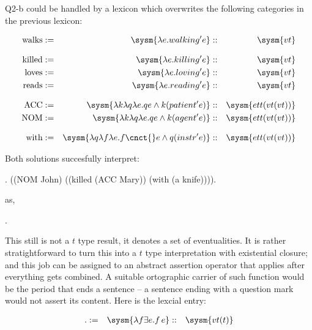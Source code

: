 \documentclass[10pt,a4paper]{exam}
\begin{document}
Q2-b could be handled by a lexicon which overwrites the following categories in the previous lexicon:


\begin{ulexicon}

\begin{align*}
	\text{walks}   &:=& \sysm{\lambda e.walking'e}  &::& \sysm{vt}\\[8pt]
	\text{killed}  &:=& \sysm{\lambda e.killing' e}   &::& \sysm{vt}\\
	\text{loves}   &:=& \sysm{\lambda e.loving' e}   &::& \sysm{vt}\\
	\text{reads}   &:=& \sysm{\lambda e.reading' e}   &::& \sysm{vt}\\[8pt]
	\text{ACC}     &:=& \sysm{\lambda k\lambda q\lambda e.q e \land k (patient' e)} &::& \sysm{ett(vt(vt))}\\
	\text{NOM}     &:=& \sysm{\lambda k\lambda q\lambda e.q e \land k (agent' e)} &::& \sysm{ett(vt(vt))}\\[8pt]
	\text{with}    &:=& \sysm{\lambda q\lambda f \lambda e.f\cnct{} e \land q (instr' e)} &::& \sysm{ett(vt(vt))}\\
\end{align*}

\end{ulexicon}

Both solutions succesfully interpret:

\ex. ((NOM John) ((killed (ACC Mary)) (with (a knife)))).

as,

\ex. 


This still is not a $t$ type result, it denotes a set of
eventualities. It is rather stratightforward to turn this into a $t$
type interpretation with existential closure; and this job can be
assigned to an abstract assertion operator that applies after
everything gets combined. A suitable ortographic carrier of such
function would be the period that ends a sentence -- a sentence ending
with a question mark would not assert its content. Here is the lexcial
entry:

\begin{ulexicon}

\begin{align*}
	\text{.}    &:=& \sysm{\lambda f \exists e.f\, e} &::& \sysm{vt(t)}\\
\end{align*}

\end{ulexicon}
\end{document}
